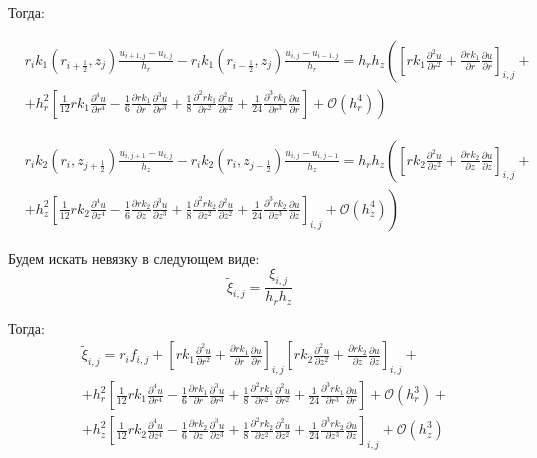 Тогда:

\begin{align*}
  &r_i k_1(r_{i + \frac{1}{2}}, z_j) \frac{u_{i + 1, j} - u_{i, j}}{h_r} - r_i k_1 (r_{i - \frac{1}{2}}, z_j) \frac{u_{i,j} - u_{i - 1, j}}{h_r} =
  h_r h_z \left( \left[ rk_1 \frac{\partial^2 u}{\partial r^2} + \frac{\partial rk_1}{\partial r}\frac{\partial u}{\partial r} \right]_{i, j} \right. + \\
  &+ \left. h^2_r\left[ \frac{1}{12} r k_1 \frac{\partial^4 u}{\partial r^4} - \frac{1}{6}\frac{\partial rk_1}{\partial r}\frac{\partial^3 u}{\partial r^3}
  + \frac{1}{8} \frac{\partial^2 rk_1}{\partial r^2}\frac{\partial^2 u}{\partial r^2}
  + \frac{1}{24} \frac{\partial^3 rk_1}{\partial r^3}\frac{\partial u}{\partial r} \right] + \mathcal{O}(h_r^4) \right)
\end{align*}


\begin{align*}
  &r_{i} k_2(r_i, z_{j+\frac{1}{2}}) \frac{u_{i, j + 1} - u_{i, j}}{h_z} - r_{i} k_2(r_i, z_{j-\frac{1}{2}}) \frac{u_{i, j} - u_{i, j - 1}}{h_z} =
  h_r h_z \left(
    \left[ r k_2 \frac{\partial^2 u}{\partial z^2}
    + \frac{\partial r k_2}{\partial z} \frac{\partial u}{\partial z} \right]_{i, j}
   \right. +\\
  &+ \left. h^2_z \left[
    \frac{1}{12} r k_2 \frac{\partial^4 u}{\partial z^4} - \frac{1}{6} \frac{\partial r k_2}{\partial z} \frac{\partial^3 u}{\partial z^3}
    + \frac{1}{8} \frac{\partial^2 r k_2}{\partial z^2} \frac{\partial^2 u}{\partial z^2}
    + \frac{1}{24} \frac{\partial^3 r k_2}{\partial z^3} \frac{\partial u}{\partial z}
     \right]_{i, j} + \mathcal{O}(h_z^4) \right)
\end{align*}

Будем искать невязку в следующем виде:
\[
  \tilde{\xi}_{i, j} = \frac{\xi_{i, j}}{h_r h_z}
\]

Тогда:
\begin{align*}
  &\tilde{\xi}_{i, j} = r_if_{i, j} + \left[ rk_1 \frac{\partial^2 u}{\partial r^2} + \frac{\partial rk_1}{\partial r}\frac{\partial u}{\partial r} \right]_{i, j} \left[ r k_2 \frac{\partial^2 u}{\partial z^2}
  + \frac{\partial r k_2}{\partial z} \frac{\partial u}{\partial z} \right]_{i, j} + \\
  &+h^2_r\left[ \frac{1}{12} r k_1 \frac{\partial^4 u}{\partial r^4} - \frac{1}{6}\frac{\partial rk_1}{\partial r}\frac{\partial^3 u}{\partial r^3}
  + \frac{1}{8} \frac{\partial^2 rk_1}{\partial r^2}\frac{\partial^2 u}{\partial r^2}
  + \frac{1}{24} \frac{\partial^3 rk_1}{\partial r^3}\frac{\partial u}{\partial r} \right] + \mathcal{O}(h_r^3) + \\
  &+ h^2_z \left[
    \frac{1}{12} r k_2 \frac{\partial^4 u}{\partial z^4} - \frac{1}{6} \frac{\partial r k_2}{\partial z} \frac{\partial^3 u}{\partial z^3}
    + \frac{1}{8} \frac{\partial^2 r k_2}{\partial z^2} \frac{\partial^2 u}{\partial z^2}
    + \frac{1}{24} \frac{\partial^3 r k_2}{\partial z^3} \frac{\partial u}{\partial z}
     \right]_{i, j} + \mathcal{O}(h_z^3)
\end{align*}

